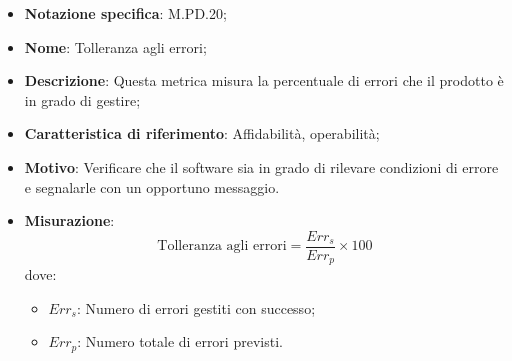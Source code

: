 \begin{itemize}
    \item \textbf{Notazione specifica}: M.PD.20;
    \item \textbf{Nome}: Tolleranza agli errori;
    \item \textbf{Descrizione}: Questa metrica misura la percentuale di errori che il prodotto è in grado di gestire;
    \item \textbf{Caratteristica di riferimento}: Affidabilità, operabilità;
    \item \textbf{Motivo}: Verificare che il software sia in grado di rilevare condizioni di errore e segnalarle con un opportuno messaggio.
    \item \textbf{Misurazione}:
    \[
        \text{Tolleranza agli errori} = \frac{Err_{s}}{Err_{p}} \times 100
    \]
    dove:
    \begin{itemize}
        \item $Err_{s}$: Numero di errori gestiti con successo;
        \item $Err_{p}$: Numero totale di errori previsti.
    \end{itemize}
\end{itemize}
